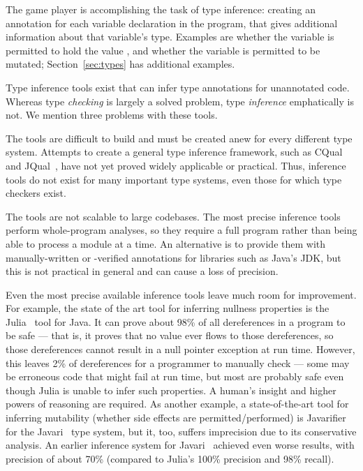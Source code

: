 \documentclass{sig-alternate}
\def\<#1>{\codeid{#1}}
\newcommand{\codeid}[1]{\ifmmode{\mbox{\ttfamily{#1}}}\else{\ttfamily #1}\fi}
\let\Itemize =\itemize
\def\Nospacing{\itemsep=0pt\topsep=0pt\partopsep=0pt\parskip=0pt\parsep=0pt}
\renewenvironment{itemize}{\Itemize\Nospacing}{\endlist}
\begin{document}
The game player is accomplishing the task of type inference:  creating an
annotation for each variable declaration in the program, that gives
additional information about that variable's type.  Examples are whether
the variable is permitted to hold the value \<null>, and whether the
variable is permitted to be mutated; Section~\ref{sec:types} has additional
examples.

Type inference tools exist that can infer type annotations for unannotated
code.  Whereas type \emph{checking} is largely a solved problem, type
\emph{inference} emphatically is not.
We mention three problems with these tools.
\begin{itemize}
\item
  The tools are difficult to build and must be created anew for every
  different type system.  Attempts to create a general type inference
  framework, such as CQual~\cite{FosterFFA99,foster:pldi02,FosterJKA2006}
  and JQual~\cite{GreenfieldboyceF2005,GreenfieldboyceF2007}, have not yet
  proved widely applicable or practical.  Thus, inference tools do not
  exist for many important type systems, even those for which type checkers
  exist.

\item
  The tools are not scalable to large codebases.  The most precise
  inference tools perform whole-program analyses, so they require a full
  program rather than being able to process a module at a time.  An
  alternative is to provide them with manually-written or -verified
  annotations for libraries such as Java's JDK, but this is not practical
  in general and can cause a loss of precision.

\item
  Even the most precise available inference tools leave much room for
  improvement.  For example, the state of the art tool for inferring
  nullness properties is the
  Julia~\cite{julia-web-interface,Spoto2008,Spoto10:LPAR,Spoto10,SpotoE2011}
  tool for Java.  It can prove about 98\% of all dereferences in a program
  to be safe --- that is, it proves that no \<null> value ever flows to
  those dereferences, so those dereferences cannot result in a null pointer
  exception at run time.  However, this leaves 2\% of dereferences for a
  programmer to manually check --- some may be erroneous code that might
  fail at run time, but most are probably safe even though Julia is unable
  to infer such properties.  A human's insight and higher powers of
  reasoning are required.  As another example, a state-of-the-art tool for
  inferring mutability (whether side effects are permitted/performed) is
  Javarifier~\cite{Quinonez2008,QuinonezTE2008} for the
  Javari~\cite{BirkaE2004,TschantzE2005,Tschantz2006} type system, but it,
  too, suffers imprecision due to its conservative analysis.  An earlier
  inference system for
  Javari~\cite{GreenfieldboyceF2005,GreenfieldboyceF2007} achieved even
  worse results, with precision of about 70\% (compared to Julia's 100\%
  precision and 98\% recall).

\end{itemize}
\end{document}
